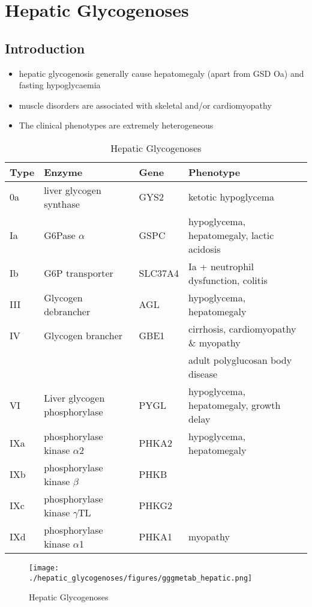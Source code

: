 \documentclass{scrartcl}
\begin{document}
\section{Hepatic Glycogenoses}
\label{sec:orga9c23fb}
\subsection{Introduction}
\label{sec:org283bebe}
\begin{itemize}
\item hepatic glycogenosis generally cause hepatomegaly (apart from GSD
Oa) and fasting hypoglycaemia
\item muscle disorders are associated with skeletal and/or
cardiomyopathy
\item The clinical phenotypes are extremely heterogeneous
\end{itemize}
\begin{table}[htbp]
\caption{\label{tab:orgd7dc973}
Hepatic Glycogenoses}
\centering
\begin{tabular}{llll}
Type & Enzyme & Gene & Phenotype\\
\hline
0a & liver glycogen synthase & GYS2 & ketotic hypoglycema\\
Ia & G6Pase \(\alpha\) & GSPC & hypoglycema, hepatomegaly, lactic acidosis\\
Ib & G6P transporter & SLC37A4 & Ia + neutrophil dysfunction, colitis\\
III & Glycogen debrancher & AGL & hypoglycema, hepatomegaly\\
IV & Glycogen brancher & GBE1 & cirrhosis, cardiomyopathy \& myopathy\\
 &  &  & adult polyglucosan body disease\\
VI & Liver glycogen phosphorylase & PYGL & hypoglycema, hepatomegaly, growth delay\\
IXa & phosphorylase kinase \(\alpha\)2 & PHKA2 & hypoglycema, hepatomegaly\\
IXb & phosphorylase kinase \(\beta\) & PHKB & \\
IXc & phosphorylase kinase \(\gamma\)TL & PHKG2 & \\
IXd & phosphorylase kinase \(\alpha\)1 & PHKA1 & myopathy\\
\end{tabular}
\end{table}

\begin{figure}[htbp]
\centering
\texttt{[image: ./hepatic\_glycogenoses/figures/gggmetab\_hepatic.png]}
\caption[Hepatic Glycogenoses]{\label{fig:orgc878ad5}
Hepatic Glycogenoses}
\end{figure}
\end{document}
